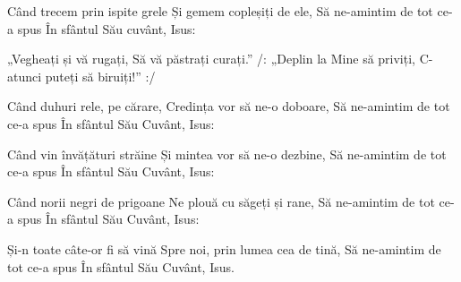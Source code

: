 \beginverse
Când trecem prin ispite grele
Și gemem copleșiți de ele,
Să ne-amintim de tot ce-a spus
În sfântul Său cuvânt, Isus:
\endverse

\beginchorus
„Vegheați și vă rugați,
Să vă păstrați curați.”
/: „Deplin la Mine să priviți,
C-atunci puteți să biruiți!” :/
\endchorus

\beginverse
Când duhuri rele, pe cărare,
Credința vor să ne-o doboare,
Să ne-amintim de tot ce-a spus
În sfântul Său Cuvânt, Isus:
\endverse

\beginverse
Când vin învățături străine
Și mintea vor să ne-o dezbine,
Să ne-amintim de tot ce-a spus
În sfântul Său Cuvânt, Isus:
\endverse

\beginverse
Când norii negri de prigoane
Ne plouă cu săgeți și rane,
Să ne-amintim de tot ce-a spus
În sfântul Său Cuvânt, Isus:
\endverse

\beginverse
Și-n toate câte-or fi să vină
Spre noi, prin lumea cea de tină,
Să ne-amintim de tot ce-a spus
În sfântul Său Cuvânt, Isus.
\endverse
\endsong